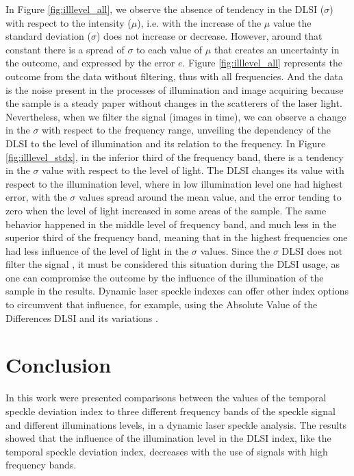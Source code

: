 \documentclass[review]{elsarticle}
\begin{document}
In Figure \ref{fig:illlevel_all}, we observe the absence of tendency in the DLSI ($\sigma$) with respect to the intensity ($\mu$), i.e. with the increase of the $\mu$ value the standard deviation ($\sigma$) does not increase or decrease. However, around that constant there is a spread of $\sigma$ to each value of $\mu$ that creates an uncertainty in the outcome, and expressed by the error $e$. Figure \ref{fig:illlevel_all} represents the outcome from the data without filtering, thus with all frequencies. And the data is the noise present in the processes of illumination and image acquiring because the sample is a steady paper without changes in the scatterers of the laser light.
Nevertheless, when we filter the signal (images in time), we can observe a change in the $\sigma$ with respect to the frequency range, unveiling the dependency of the DLSI to the level of illumination and its relation to the frequency.
In Figure \ref{fig:illlevel_stdx}, in the inferior third of the frequency band, there is a tendency in the $\sigma$ value with respect to the level of light. The DLSI changes its value with respect to the illumination level, where in low illumination level one had highest error, with the $\sigma$ values spread around the mean value, and the error tending to zero when the level of light increased in some areas of the sample. The same behavior happened in the middle level of frequency band, and much less in the superior third of the frequency band, meaning that in the highest frequencies one had less influence of the level of light in the $\sigma$ values. Since the $\sigma$ DLSI does not filter the signal \cite{RIVERA2017144}, it must be considered this situation during the DLSI usage, as one can compromise the outcome by the influence of the illumination of the sample in the results. Dynamic laser speckle indexes can offer other index  options to circumvent that influence, for example, using the Absolute Value of the Differences DLSI and its variations \cite{BSLTLBOOK}.



\section{Conclusion} 

In this work were presented comparisons between the values of the temporal speckle 
deviation index to three different frequency bands of the speckle signal and
different illuminations levels, in a
dynamic laser speckle analysis. The results showed that the influence of the illumination level in
the DLSI index, like the temporal speckle deviation 
index, decreases with the use of signals with high frequency bands.
\end{document}
